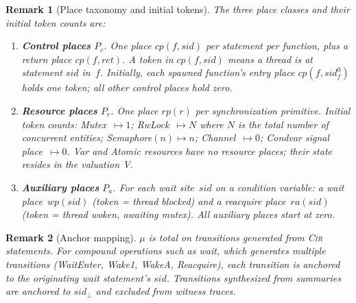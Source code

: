 \documentclass[sigconf]{acmart}
\newtheorem{remark}{Remark}
\begin{document}
\begin{remark}[Place taxonomy and initial tokens]
\label{rem:places}
The three place classes and their initial token counts are:
\begin{enumerate}
  \item \textbf{Control places} $P_c$. One place $\mathit{cp}(f,\mathit{sid})$ per statement per function, plus a return place $\mathit{cp}(f,\mathit{ret})$. A token in $\mathit{cp}(f,\mathit{sid})$ means a thread is at statement $\mathit{sid}$ in~$f$. Initially, each spawned function's entry place $\mathit{cp}(f,\mathit{sid}^{0}_{f})$ holds one token; all other control places hold zero.

  \item \textbf{Resource places} $P_r$. One place $\mathit{rp}(r)$ per synchronization primitive. Initial token counts:
    Mutex~$\mapsto1$;\; RwLock~$\mapsto N$ where $N$ is the total number of concurrent entities;\; Semaphore$(n)\mapsto n$;\;
    Channel~$\mapsto 0$;\; Condvar signal place~$\mapsto 0$. \textsf{Var} and \textsf{Atomic} resources have no resource
    places; their state resides in the valuation~$V$.

  \item \textbf{Auxiliary places} $P_a$. For each \textsf{wait} site~$\mathit{sid}$ on a condition variable: a \emph{wait place}~$\mathit{wp}(\mathit{sid})$ (token = thread blocked) and a \emph{reacquire place}~$\mathit{ra}(\mathit{sid})$ (token = thread woken, awaiting mutex). All auxiliary places start at zero.
\end{enumerate}
\end{remark}


\begin{remark}[Anchor mapping]
\label{rem:anchor}
$\mu$ is total on transitions generated from \textsc{Cir} statements. For compound operations such as \textsf{wait}, which generates multiple transitions (WaitEnter, Wake1, WakeA, Reacquire), each transition is anchored to the originating \textsf{wait} statement's $\mathit{sid}$. Transitions synthesized from summaries are anchored to $\mathit{sid}_{\bot}$ and excluded from witness traces.
\end{remark}
\end{document}
